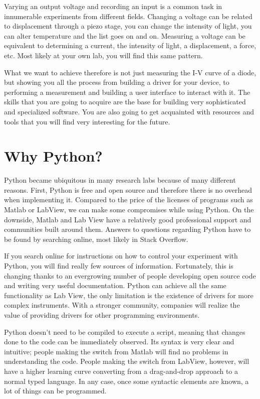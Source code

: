 Varying an output voltage and recording an input is a common task in innumerable experiments from different fields. Changing a voltage can be related to displacement through a piezo stage, you can change the intensity of light, you can alter temperature and the list goes on and on. Measuring a voltage can be equivalent to determining a current, the intensity of light, a displacement, a force, etc. Most likely at your own lab, you will find this same pattern.

What we want to achieve therefore is not just measuring the I-V curve of a diode, but showing you all the process from building a driver for your device, to performing a measurement and building a user interface to interact with it. The skills that you are going to acquire are the base for building very sophisticated and specialized software. You are also going to get acquainted with resources and tools that you will find very interesting for the future.

\section{Why Python?}

Python became ubiquitous in many research labs because of many different reasons. First, Python is free and open source and therefore there is no overhead when implementing it. Compared to the price of the licenses of programs such as Matlab or LabView, we can make some compromises while using Python. On the downside, Matlab and Lab View have a relatively good professional support and communities built around them. Answers to questions regarding Python have to be found by searching online, most likely in Stack Overflow.

If you search online for instructions on how to control your experiment with Python, you will find really few sources of information. Fortunately, this is changing thanks to an evergrowing number of people developing open source code and writing very useful documentation. Python can achieve all the same functionality as Lab View, the only limitation is the existence of drivers for more complex instruments. With a stronger community, companies will realize the value of providing drivers for other programming environments.

Python doesn’t need to be compiled to execute a script, meaning that changes done to the code can be immediately observed. Its syntax is very clear and intuitive; people making the switch from Matlab will find no problems in understanding the code. People making the switch from LabView, however, will have a higher learning curve converting from a drag-and-drop approach to a normal typed language. In any case, once some syntactic elements are known, a lot of things can be programmed.

